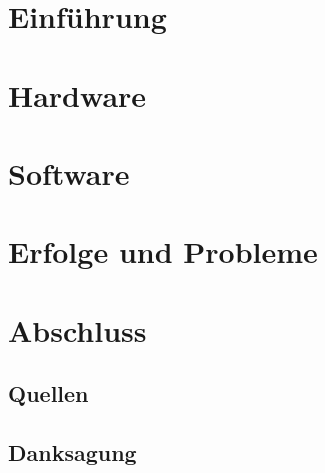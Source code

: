 


\newcommand{\dates}{6. März 2011}



\makepages

\part{Einführung}
	
\part{Hardware}
	
\part{Software}
	
\part{Erfolge und Probleme}
		
	

\part{Abschluss}
\cleardoublepage
{}
\printindex

\chapter*{Quellen}
\chapter*{Danksagung}


